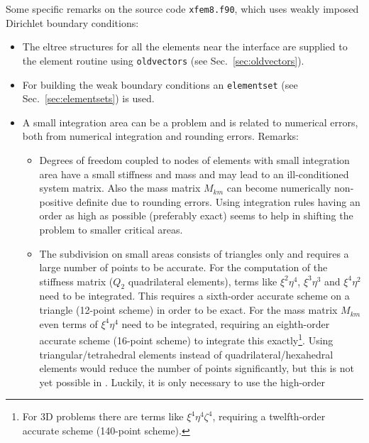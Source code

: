 Some specific remarks on the source code \texttt{xfem8.f90}, which uses weakly
imposed Dirichlet boundary conditions: 
\begin{itemize}
   \item The eltree structures for all the elements near the interface are
supplied to the element routine using \texttt{oldvectors} (see
Sec.~\ref{sec:oldvectors}).
   \item For building the weak boundary conditions an
\texttt{elementset} (see Sec.~\ref{sec:elementsets}) is used.
\item
A small integration
area can be a problem and is related to numerical errors,
both from numerical integration and rounding errors.
Remarks:
         \begin{itemize}
            \item Degrees of freedom coupled to nodes of elements with small
                  integration area have a small stiffness and mass
                  and may lead to an ill-conditioned system matrix.
                  Also the mass matrix $M_{km}$ can become numerically
                  non-positive definite due to rounding errors. Using
                  integration rules having an order as high as
                  possible (preferably exact)
                  seems to help in shifting the problem to smaller critical
                  areas.
            \item The subdivision on small areas consists of triangles only and
                  requires a large number of points to be accurate.
                  For the computation of the stiffness matrix ($Q_2$
                  quadrilateral elements), terms like $\xi^2\eta^4$,
                  $\xi^3\eta^3$ and $\xi^4\eta^2$ need to be integrated.
                  This requires a sixth-order accurate scheme on a triangle
                  (12-point scheme) in order to be exact.
                  For the mass matrix $M_{km}$ even terms of $\xi^4\eta^4$
                  need to be integrated, requiring an eighth-order accurate
                  scheme (16-point scheme) to integrate this
                  exactly\footnote{For 3D problems there are terms like
                  $\xi^4\eta^4\zeta^4$,
                  requiring a twelfth-order accurate scheme (140-point
                  scheme).}.
                  Using triangular/tetrahedral elements instead of
                  quadrilateral/hexahedral elements would reduce the number of
                  points significantly, but this is not yet possible in \tfem.
                  Luckily, it is only necessary to use the high-order

\end{itemize}
\end{itemize}
